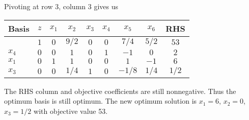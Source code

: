 \documentclass{article}[12pt,a4paper]
\begin{document}
\begin{enumerate}
  Pivoting at row $3$, column $3$ gives us
  \begin{center}
 \begin{tabular}{l | c | c c c c c c | c}
            Basis & $z$ & $x_1$ & $x_2$ & $x_3$ & $x_4$ & $x_5$ & $x_6$ & RHS \\ \hline
  	           & $1$ & $0$ & $9/2$ & $0$   & $0$       & $7/4$     & $5/2$ & $53$  \\ \hline
  	$x_4$ & $0$ & $0$ & $1$     & $0$   & $1$      & $-1$     & $0$     & $2$ \\
  	$x_1$ & $0$ & $1$ & $1$    & $0$    & $0$      & $1$     & $-1$     & $6$ \\
  	$x_3$ & $0$ & $0$ & $1/4$ & $1$    & $0$      & $-1/8$     & $1/4$     & $1/2$ \\
  \end{tabular}
  \end{center}
  
  The RHS column and objective coefficients are still nonnegative. Thus the optimum basis is
  still optimum. The new optimum solution is $x_1 = 6$, $x_2 = 0$, $x_3 = 1/2$ with objective
  value 53.
  \pagebreak
  

\end{enumerate}
\end{document}
